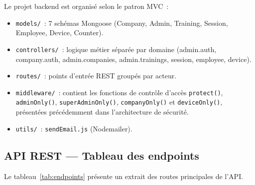 Le projet backend est organisé selon le patron MVC~:

\begin{itemize}
  \item \texttt{models/}~: 7 schémas Mongoose (Company, Admin, Training, Session,
  Employee, Device, Counter).
\item \texttt{controllers/}~: logique métier séparée par domaine (admin.auth,
  company.auth, admin.companies, admin.trainings, session, employee, device).
  \item \texttt{routes/}~: points d'entrée REST groupés par acteur.
  \item \texttt{middleware/}~: contient les fonctions de contrôle d'accès
  \texttt{protect()}, \texttt{adminOnly()}, \texttt{superAdminOnly()},
  \texttt{companyOnly()} et \texttt{deviceOnly()}, présentées précédemment
  dans l'architecture de sécurité.
  \item \texttt{utils/}~: \texttt{sendEmail.js} (Nodemailer).
\end{itemize}

\subsection{API REST --- Tableau des endpoints}

Le tableau~\ref{tab:endpoints} présente un extrait des routes principales de l'API.

